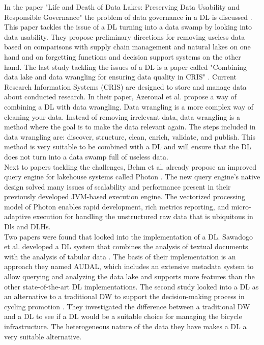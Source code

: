 \documentclass[11pt]{article}
\begin{document}
In the paper "Life and Death of Data Lakes: Preserving Data Usability and Responsible Governance" the problem of data governance in a DL is discussed \cite{Derakhshannia2019302}. This paper tackles the issue of a DL turning into a data swamp by looking into data usability. They propose preliminary directions for removing useless data based on comparisons with supply chain management and natural lakes on one hand and on forgetting functions and decision support systems on the other hand. The last study tackling the issues of a DL is a paper called "Combining data lake and data wrangling for ensuring data quality in CRIS" \cite{Azeroual20223}. Current Research Information Systems (CRIS) are designed to store and manage data about conducted research. In their paper, Azeroual et al. propose a way of combining a DL with data wrangling. Data wrangling is a more complex way of cleaning your data. Instead of removing irrelevant data, data wrangling is a method where the goal is to make the data relevant again. The steps included in data wrangling are: discover, structure, clean, enrich, validate, and publish. This method is very suitable to be combined with a DL and will ensure that the DL does not turn into a data swamp full of useless data. \\

Next to papers tackling the challenges, Behm et al. already propose an improved query engine for lakehouse systems called Photon \cite{Behm20222326}. The new query engine's native design solved many issues of scalability and performance present in their previously developed JVM-based execution engine. The vectorized processing model of Photon enables rapid development, rich metrics reporting, and micro-adaptive execution for handling the unstructured raw data that is ubiquitous in Dls and DLHs. \\

Two papers were found that looked into the implementation of a DL. Sawadogo et al. developed a DL system that combines the analysis of textual documents with the analysis of tabular data \cite{Sawadogo202188}. The basis of their implementation is an approach they named AUDAL, which includes an extensive metadata system to allow querying and analyzing the data lake and supports more features than the other state-of-the-art DL implementations. The second study looked into a DL as an alternative to a traditional DW to support the decision-making process in cycling promotion \cite{Schering2022783}. They investigated the difference between a traditional DW and a DL to see if a DL would be a suitable choice for managing the bicycle infrastructure. The heterogeneous nature of the data they have makes a DL a very suitable alternative. \\
\end{document}
